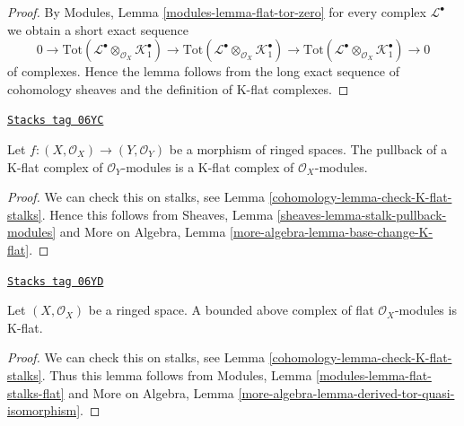 \begin{proof}
By Modules, Lemma \ref{modules-lemma-flat-tor-zero}
for every complex $\mathcal{L}^\bullet$
we obtain a short exact sequence
$$
0 \to
\text{Tot}(\mathcal{L}^\bullet \otimes_{\mathcal{O}_X} \mathcal{K}_1^\bullet)
\to
\text{Tot}(\mathcal{L}^\bullet \otimes_{\mathcal{O}_X} \mathcal{K}_1^\bullet)
\to
\text{Tot}(\mathcal{L}^\bullet \otimes_{\mathcal{O}_X} \mathcal{K}_1^\bullet)
\to 0
$$
of complexes. Hence the lemma follows from the long exact sequence of
cohomology sheaves and the definition of K-flat complexes.
\end{proof}

\begin{lemma}
\label{cohomology-lemma-pullback-K-flat}
\href{https://stacks.math.columbia.edu/tag/06YC}{\texttt{Stacks tag 06YC}}

Let $f : (X, \mathcal{O}_X) \to (Y, \mathcal{O}_Y)$ be a morphism of
ringed spaces. The pullback of a K-flat complex of $\mathcal{O}_Y$-modules
is a K-flat complex of $\mathcal{O}_X$-modules.
\end{lemma}

\begin{proof}

We can check this on stalks, see
Lemma \ref{cohomology-lemma-check-K-flat-stalks}.
Hence this follows from
Sheaves, Lemma \ref{sheaves-lemma-stalk-pullback-modules}
and
More on Algebra, Lemma \ref{more-algebra-lemma-base-change-K-flat}.
\end{proof}

\begin{lemma}
\label{cohomology-lemma-bounded-flat-K-flat}
\href{https://stacks.math.columbia.edu/tag/06YD}{\texttt{Stacks tag 06YD}}

Let $(X, \mathcal{O}_X)$ be a ringed space. A bounded above complex
of flat $\mathcal{O}_X$-modules is K-flat.
\end{lemma}

\begin{proof}

We can check this on stalks, see
Lemma \ref{cohomology-lemma-check-K-flat-stalks}.
Thus this lemma follows from
Modules, Lemma \ref{modules-lemma-flat-stalks-flat}
and
More on Algebra, Lemma \ref{more-algebra-lemma-derived-tor-quasi-isomorphism}.
\end{proof}

